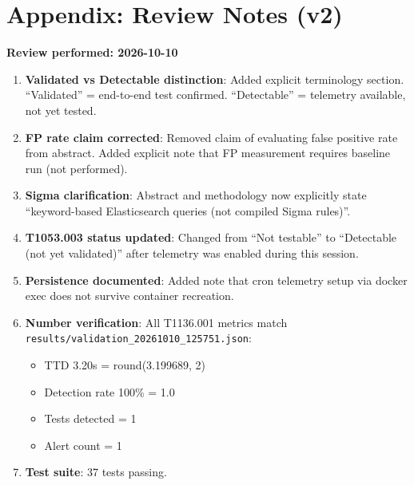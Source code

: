 \documentclass[11pt,a4paper]{article}
\begin{document}
\section*{Appendix: Review Notes (v2)}

\textbf{Review performed: 2026-10-10}

\begin{enumerate}
    \item \textbf{Validated vs Detectable distinction}: Added explicit terminology section. ``Validated'' = end-to-end test confirmed. ``Detectable'' = telemetry available, not yet tested.

    \item \textbf{FP rate claim corrected}: Removed claim of evaluating false positive rate from abstract. Added explicit note that FP measurement requires baseline run (not performed).

    \item \textbf{Sigma clarification}: Abstract and methodology now explicitly state ``keyword-based Elasticsearch queries (not compiled Sigma rules)''.

    \item \textbf{T1053.003 status updated}: Changed from ``Not testable'' to ``Detectable (not yet validated)'' after telemetry was enabled during this session.

    \item \textbf{Persistence documented}: Added note that cron telemetry setup via docker exec does not survive container recreation.

    \item \textbf{Number verification}: All T1136.001 metrics match \texttt{results/validation\_20261010\_125751.json}:
    \begin{itemize}
        \item TTD 3.20s = round(3.199689, 2) \checkmark
        \item Detection rate 100\% = 1.0 \checkmark
        \item Tests detected = 1 \checkmark
        \item Alert count = 1 \checkmark
    \end{itemize}

    \item \textbf{Test suite}: 37 tests passing.
\end{enumerate}
\end{document}
